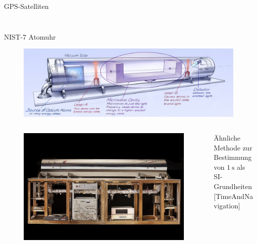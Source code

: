\begin{frame}{GPS-Satelliten}
\begin{columns}
\begin{column}{0.5\textwidth}
\begin{figure}
            \end{figure}
        \end{column}
    \end{columns}
\end{frame}

\begin{frame}{NIST-7 Atomuhr}
    \begin{figure}
        \centering
        \includegraphics[width=\textwidth]{images/nist-7.jpg}
    \end{figure}
    \begin{columns}
        \begin{column}{0.5\textwidth}
            \begin{figure}
                \centering
                \includegraphics[height=0.4\textheight]{images/nist-7-real.jpg}
            \end{figure}
        \end{column}
        \begin{column}{0.5\textwidth}
            Ähnliche Methode zur Bestimmung\\
            von $\SI{1}{\second}$ als SI-Grundheiten\\
            {\small [TimeAndNavigation]}
        \end{column}
    \end{columns}
\end{frame}
